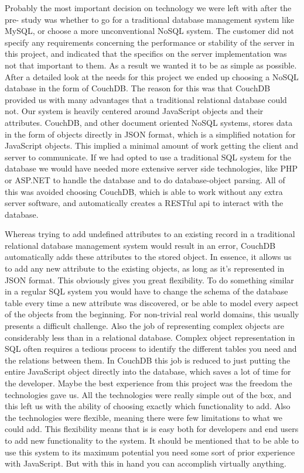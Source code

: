 Probably the most important decision on technology we were left with after the pre- study was whether to go for a traditional database management system like MySQL, or choose a more unconventional NoSQL system. The customer did not specify any requirements concerning the performance or stability of the server in this project, and indicated that the specifics on the server implementation was not that important to them. As a result we wanted it to be as simple as possible. After a detailed look at the needs for this project we ended up choosing a NoSQL database in the form of CouchDB. The reason for this was that CouchDB provided us with many advantages that a traditional relational database could not. Our system is heavily centered around JavaScript objects and their attributes. CouchDB, and other document oriented NoSQL systems, stores data in the form of objects directly in JSON format, which is a simplified notation for JavaScript objects. This implied a minimal amount of work getting the client and server to communicate. If we had opted to use a traditional SQL system for the database we would have needed more extensive server side technologies, like PHP or ASP.NET to handle the database and to do database-object parsing. All of this was avoided choosing CouchDB, which is able to work without any extra server software, and automatically creates a RESTful api to interact with the database. 

Whereas trying to add undefined attributes to an existing record in a traditional relational database management system would result in an error, CouchDB automatically adds these attributes to the stored object. In essence, it allows us to add any new attribute to the existing objects, as long as it's represented in JSON format. This obviously gives you great flexibility. To do something similar in a regular SQL system you would have to change the schema of the database table every time a new attribute was discovered, or be able to model every aspect of the objects from the beginning. For non-trivial real world domains, this usually presents a difficult challenge. Also the job of representing complex objects are considerably less than in a relational database. Complex object representation in SQL often requires a tedious process to identify the different tables you need and the relations between them. In CouchDB this job is reduced to just putting the entire JavaScript object directly into the database, which saves a lot of time for the developer. Maybe the best experience from this project was the freedom the technologies gave us. All the technologies were really simple out of the box, and this left us with the ability of choosing exactly which functionality to add. Also the technologies were flexible, meaning there were few limitations to what we could add. This flexibility means that is is easy both for developers and end users to add new functionality to the system. It should be mentioned that to be able to use this system to its maximum potential you need some sort of prior experience with JavaScript. But with this in hand you can accomplish virtually anything.


